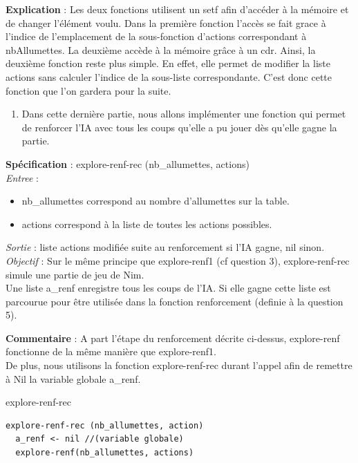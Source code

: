\documentclass[
]{article}
\providecommand{\tightlist}{%
  \setlength{\itemsep}{0pt}\setlength{\parskip}{0pt}}
\begin{document}
\textbf{Explication} : Les deux fonctions utilisent un setf afin
d'accéder à la mémoire et de changer l'élément voulu. Dans la première
fonction l'accès se fait grace à l'indice de l'emplacement de la
sous-fonction d'actions correspondant à nbAllumettes. La deuxième
accède à la mémoire grâce à un cdr. Ainsi, la deuxième fonction reste
plus simple. En effet, elle permet de modifier la liste actions sans
calculer l'indice de la sous-liste correspondante. C'est donc cette
fonction que l'on gardera pour la suite.

\begin{enumerate}
\def\labelenumi{\arabic{enumi}.}
\setcounter{enumi}{5}
\tightlist
\item
  Dans cette dernière partie, nous allons implémenter une fonction qui
  permet de renforcer l'IA avec tous les coups qu'elle a pu jouer dès
  qu'elle gagne la partie.
\end{enumerate}

\textbf{Spécification} : explore-renf-rec (nb\_allumettes, actions)\\
\emph{Entree} :
\begin{itemize}
\item nb\_allumettes correspond au nombre d'allumettes sur la table. 
\item actions correspond à la liste de toutes les actions possibles.
\end{itemize}

\emph{Sortie} : liste actions modifiée suite au renforcement si l'IA
gagne, nil sinon.\\
\emph{Objectif} : Sur le même principe que explore-renf1 (cf question
3), explore-renf-rec simule une partie de jeu de Nim.\\
Une liste a\_renf enregistre tous les coups de l'IA. Si elle gagne cette
liste est parcourue pour être utilisée dans la fonction renforcement
(definie à la question 5).

\textbf{Commentaire} : A part l'étape du renforcement décrite ci-dessus,
explore-renf fonctionne de la même manière que explore-renf1.\\
De plus, nous utilisons la fonction explore-renf-rec durant l'appel afin
de remettre à Nil la variable globale a\_renf.

\begin{algorithm}[H]
    \caption{explore-renf-rec}
\begin{verbatim}
explore-renf-rec (nb_allumettes, action)
  a_renf <- nil //(variable globale)
  explore-renf(nb_allumettes, actions)
\end{verbatim}
\end{algorithm}
\end{document}
